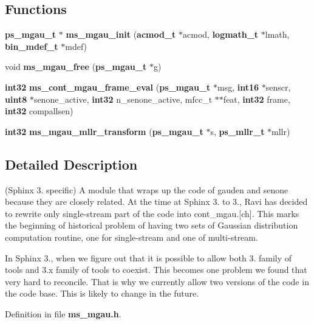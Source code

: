 \subsection*{\-Functions}
\begin{DoxyCompactItemize}
\item 
{\bf ps\-\_\-mgau\-\_\-t} $\ast$ {\bfseries ms\-\_\-mgau\-\_\-init} ({\bf acmod\-\_\-t} $\ast$acmod, {\bf logmath\-\_\-t} $\ast$lmath, {\bf bin\-\_\-mdef\-\_\-t} $\ast$mdef)\label{ms__mgau_8h_a7dbdcb8e1901665b955e324eefdfeea3}

\item 
void {\bfseries ms\-\_\-mgau\-\_\-free} ({\bf ps\-\_\-mgau\-\_\-t} $\ast$g)\label{ms__mgau_8h_ae553fda1fe6082d50cb95b06a85b2be6}

\item 
{\bf int32} {\bfseries ms\-\_\-cont\-\_\-mgau\-\_\-frame\-\_\-eval} ({\bf ps\-\_\-mgau\-\_\-t} $\ast$msg, {\bf int16} $\ast$senscr, {\bf uint8} $\ast$senone\-\_\-active, {\bf int32} n\-\_\-senone\-\_\-active, mfcc\-\_\-t $\ast$$\ast$feat, {\bf int32} frame, {\bf int32} compallsen)\label{ms__mgau_8h_ab1f5637b68fdc1a4d24e4d6275353216}

\item 
{\bf int32} {\bfseries ms\-\_\-mgau\-\_\-mllr\-\_\-transform} ({\bf ps\-\_\-mgau\-\_\-t} $\ast$s, {\bf ps\-\_\-mllr\-\_\-t} $\ast$mllr)\label{ms__mgau_8h_ad3fe464ff15e735bfef15e628c5433fc}

\end{DoxyCompactItemize}


\subsection{\-Detailed \-Description}
(\-Sphinx 3. specific) \-A module that wraps up the code of gauden and senone because they are closely related. \-At the time at \-Sphinx 3. to 3., \-Ravi has decided to rewrite only single-\/stream part of the code into cont\-\_\-mgau.[ch]. \-This marks the beginning of historical problem of having two sets of \-Gaussian distribution computation routine, one for single-\/stream and one of multi-\/stream.

\-In \-Sphinx 3., when we figure out that it is possible to allow both 3. family of tools and 3.\-x family of tools to coexist. \-This becomes one problem we found that very hard to reconcile. \-That is why we currently allow two versions of the code in the code base. \-This is likely to change in the future. 

\-Definition in file {\bf ms\-\_\-mgau.\-h}.

